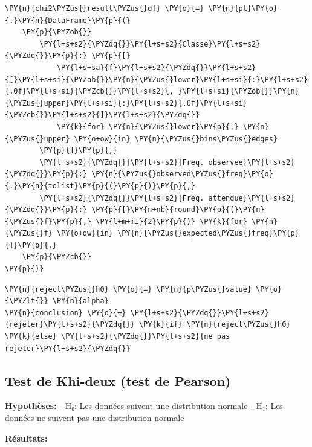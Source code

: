 \begin{tcolorbox}[breakable, size=fbox, boxrule=1pt, pad at break*=1mm,colback=cellbackground, colframe=cellborder]
\begin{Verbatim}[commandchars=\\\{\}]
\PY{n}{chi2\PYZus{}result\PYZus{}df} \PY{o}{=} \PY{n}{pl}\PY{o}{.}\PY{n}{DataFrame}\PY{p}{(}
    \PY{p}{\PYZob{}}
        \PY{l+s+s2}{\PYZdq{}}\PY{l+s+s2}{Classe}\PY{l+s+s2}{\PYZdq{}}\PY{p}{:} \PY{p}{[}
            \PY{l+s+sa}{f}\PY{l+s+s2}{\PYZdq{}}\PY{l+s+s2}{[}\PY{l+s+si}{\PYZob{}}\PY{n}{\PYZus{}lower}\PY{l+s+si}{:}\PY{l+s+s2}{.0f}\PY{l+s+si}{\PYZcb{}}\PY{l+s+s2}{, }\PY{l+s+si}{\PYZob{}}\PY{n}{\PYZus{}upper}\PY{l+s+si}{:}\PY{l+s+s2}{.0f}\PY{l+s+si}{\PYZcb{}}\PY{l+s+s2}{]}\PY{l+s+s2}{\PYZdq{}}
            \PY{k}{for} \PY{n}{\PYZus{}lower}\PY{p}{,} \PY{n}{\PYZus{}upper} \PY{o+ow}{in} \PY{n}{\PYZus{}bins\PYZus{}edges}
        \PY{p}{]}\PY{p}{,}
        \PY{l+s+s2}{\PYZdq{}}\PY{l+s+s2}{Freq. observee}\PY{l+s+s2}{\PYZdq{}}\PY{p}{:} \PY{n}{\PYZus{}observed\PYZus{}freq}\PY{o}{.}\PY{n}{tolist}\PY{p}{(}\PY{p}{)}\PY{p}{,}
        \PY{l+s+s2}{\PYZdq{}}\PY{l+s+s2}{Freq. attendue}\PY{l+s+s2}{\PYZdq{}}\PY{p}{:} \PY{p}{[}\PY{n+nb}{round}\PY{p}{(}\PY{n}{\PYZus{}f}\PY{p}{,} \PY{l+m+mi}{2}\PY{p}{)} \PY{k}{for} \PY{n}{\PYZus{}f} \PY{o+ow}{in} \PY{n}{\PYZus{}expected\PYZus{}freq}\PY{p}{]}\PY{p}{,}
    \PY{p}{\PYZcb{}}
\PY{p}{)}
\end{Verbatim}
\end{tcolorbox}

    \begin{tcolorbox}[breakable, size=fbox, boxrule=1pt, pad at break*=1mm,colback=cellbackground, colframe=cellborder]
\begin{Verbatim}[commandchars=\\\{\}]
\PY{n}{reject\PYZus{}h0} \PY{o}{=} \PY{n}{p\PYZus{}value} \PY{o}{\PYZlt{}} \PY{n}{alpha}
\PY{n}{conclusion} \PY{o}{=} \PY{l+s+s2}{\PYZdq{}}\PY{l+s+s2}{rejeter}\PY{l+s+s2}{\PYZdq{}} \PY{k}{if} \PY{n}{reject\PYZus{}h0} \PY{k}{else} \PY{l+s+s2}{\PYZdq{}}\PY{l+s+s2}{ne pas rejeter}\PY{l+s+s2}{\PYZdq{}}

\end{Verbatim}
\end{tcolorbox}



    \subsection{Test de Khi-deux (test de
Pearson)}\label{test-de-khi-deux-test-de-pearson}

\textbf{Hypothèses:} - H₀: Les données suivent une distribution normale
- H₁: Les données ne suivent pas une distribution normale

\textbf{Résultats:}

